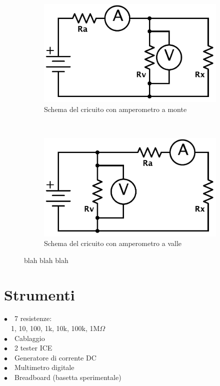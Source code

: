 \begin{figure}
    \begin{subfigure}[h!]{0.3\textwidth}
        \includegraphics[width=\textwidth]{R_monte.pdf}
        \caption{Schema del cricuito con amperometro a monte}
        \label{fig:monte}
    \end{subfigure}%
    ~~ %
    \begin{subfigure}[h!]{0.3\textwidth}
        \includegraphics[width=\textwidth]{R_valle.pdf}
        \caption{Schema del cricuito con amperometro a valle}
        \label{fig:valle}
    \end{subfigure}%
    \caption{blah blah blah}
    \label{fig:circuiti}
\end{figure}


\section{Strumenti}

$\bullet \quad$7 resistenze:\\
\phantom{x}$\quad$1, 10, 100, 1k, 10k, 100k, 1M$\Omega$\\
$\bullet \quad$Cablaggio\\
$\bullet \quad$2 tester ICE\\
$\bullet \quad$Generatore di corrente DC\\
$\bullet \quad$Multimetro digitale\\
$\bullet \quad$Breadboard (basetta sperimentale)\\
